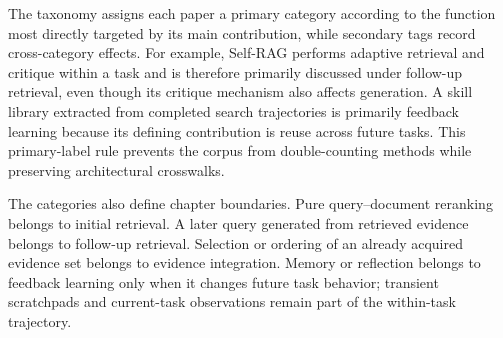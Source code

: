 The taxonomy assigns each paper a primary category according to the function most directly targeted by its main contribution, while secondary tags record cross-category effects. For example, Self-RAG performs adaptive retrieval and critique within a task and is therefore primarily discussed under follow-up retrieval, even though its critique mechanism also affects generation. A skill library extracted from completed search trajectories is primarily feedback learning because its defining contribution is reuse across future tasks. This primary-label rule prevents the corpus from double-counting methods while preserving architectural crosswalks.

The categories also define chapter boundaries. Pure query--document reranking belongs to initial retrieval. A later query generated from retrieved evidence belongs to follow-up retrieval. Selection or ordering of an already acquired evidence set belongs to evidence integration. Memory or reflection belongs to feedback learning only when it changes future task behavior; transient scratchpads and current-task observations remain part of the within-task trajectory.
